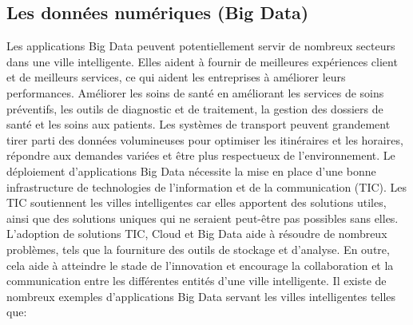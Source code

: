 \documentclass[french, a4paper, 12pt]{report}
\begin{document}
\subsection{Les données numériques (Big Data) }
Les applications Big Data peuvent potentiellement servir de nombreux secteurs dans une ville intelligente. Elles aident à fournir de meilleures expériences client et de meilleurs services, ce qui aident les entreprises à améliorer leurs performances. Améliorer les soins de santé en améliorant les services de soins préventifs, les outils de diagnostic et de traitement, la gestion des dossiers de santé et les soins aux patients. Les systèmes de transport peuvent grandement tirer parti des données volumineuses pour optimiser les itinéraires et les horaires, répondre aux demandes variées et être plus respectueux de l'environnement.
Le déploiement d’applications Big Data nécessite la mise en place d’une bonne infrastructure de technologies de l’information et de la communication (TIC). Les TIC soutiennent les villes intelligentes car elles apportent des solutions utiles, ainsi que des solutions uniques qui ne seraient peut-être pas possibles sans elles.
L’adoption de solutions TIC, Cloud et Big Data aide à résoudre de nombreux problèmes, tels que la fourniture des outils de stockage et d’analyse. En outre, cela aide à atteindre le stade de l'innovation et encourage la collaboration et la communication entre les différentes entités d'une ville intelligente.
Il existe de nombreux exemples d'applications Big Data servant les villes intelligentes telles que:
\end{document}
